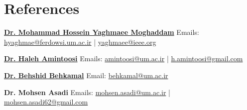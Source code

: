 \documentclass[11pt,a4paper,sans]{moderncv}        %
\begin{document}
\section{References}
\cvitem{} {\href{http://profsite.um.ac.ir/~hyaghmae/}{\textbf{Dr. Mohammad Hossein Yaghmaee Moghaddam}}}
\cvitem{} {Emails: \href{mailto:hyaghmae@ferdowsi.um.ac.ir}{hyaghmae@ferdowsi.um.ac.ir} | \href{mailto:yaghmaee@ieee.org}{yaghmaee@ieee.org} }

\cvitem{} {\href{http://amintoosi.profcms.um.ac.ir}{\textbf{Dr. Haleh Amintoosi}}}
\cvitem{} {Emails: \href{mailto:amintoosi@um.ac.ir}{amintoosi@um.ac.ir} | \href{mailto:h.amintoosi@gmail.com}{h.amintoosi@gmail.com} }

\cvitem{} {\href{http://behkamal.profcms.um.ac.ir}{\textbf{Dr. Behshid Behkamal}}}
\cvitem{} {Email: \href{mailto:behkamal@um.ac.ir}{behkamal@um.ac.ir}}

\cvitem{} {\textbf{Dr. Mohsen Asadi}}
\cvitem{} {Emails: \href{mailto:mohsen.asadi@um.ac.ir}{mohsen.asadi@um.ac.ir} | \href{mailto:mohsen.asadi62@gmail.com}{mohsen.asadi62@gmail.com}}
\end{document}
